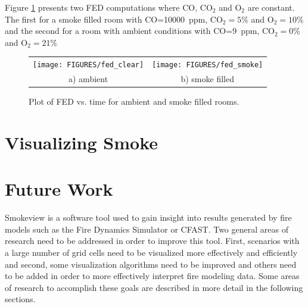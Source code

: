 \documentclass[11pt,twoside]{book}
\begin{document}
Figure \ref{fig:fedplot} presents two FED computations where CO, $\mathrm{CO_2}$ and $\mathrm{O_2}$ are constant.  The first for a smoke filled room with CO=\SI{10000}{ppm}, $\mathrm{CO_2}=5 \%$ and $\mathrm{O_2}=10 \%$ and the second for a room with ambient conditions with CO=\SI{9}{ppm}, $\mathrm{CO_2}=0 \%$ and $\mathrm{O_2}=21 \%$

\begin{figure}[\figoptions]
\begin{center}
\begin{tabular}{cc}
\texttt{[image: FIGURES/fed\_clear]}&
\texttt{[image: FIGURES/fed\_smoke]}\\
a) ambient&b) smoke filled\\
\end{tabular}
\end{center}
\caption{Plot of FED vs. time for ambient and smoke filled rooms.}
\label{fig:fedplot}%
\end{figure}

%
%

\chapter{Visualizing Smoke}

\newcommand{\citesmv}{\cite{Smokeview_Users_Guide}}
\newcommand{\paper}{chapter}

%
%

\chapter{Future Work}

Smokeview is a software tool used to gain insight into results
generated by fire models such as the Fire Dynamics Simulator or
CFAST. Two general areas of research need to be addressed in order
to improve this tool. First, scenarios with a large number of grid
cells need to be visualized more effectively and efficiently and
second, some visualization algorithms need to be improved and
others need to be added in order to more effectively interpret
fire modeling data. Some areas of research to accomplish these
goals are described in more detail in the following sections.

%
%
\end{document}
